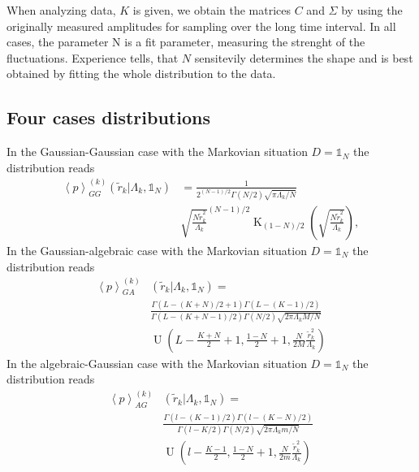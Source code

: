 When analyzing data, $K$ is given, we obtain the matrices $C$ and $\Sigma$ by
using the originally measured amplitudes for sampling over the long time interval.
In all cases, the parameter N is a fit parameter, measuring the strenght of the
fluctuations. Experience tells, that $N$ sensitevily determines the shape and is
best obtained by fitting the whole distribution to the data.

\subsection{Four cases distributions}\label{subsec:distributions}

In the Gaussian-Gaussian case with the Markovian situation $D = \mathbb{1}_{N}$
the distribution reads
\begin{equation}
    \begin{split}
    \left\langle p \right\rangle_{GG}^{\left(k\right)}
    \left(\tilde{r}_{k} \vert \Lambda_{k}, \mathbb{1}_{N}\right) &=
    \frac{1}{2^{\left(N - 1\right) / 2} \Gamma \left(N / 2\right)
    \sqrt{\pi \Lambda_{k} / N}} \\
    & \sqrt{\frac{N \tilde{r}_{k}^2}{\Lambda_{k}}}^{\left(N - 1\right) / 2}
    \operatorname{K}_{\left(1 - N\right)/2}
    \left( \sqrt{\frac{N \tilde{r}^2_{k}}{\Lambda_{k}}}\right),
    \end{split}
\end{equation}
In the Gaussian-algebraic case with the Markovian situation
$D = \mathbb{1}_{N}$ the distribution reads
\begin{equation}
    \begin{split}
    \left\langle p \right\rangle_{GA}^{\left(k\right)} &
    \left(\tilde{r}_{k} \vert \Lambda_{k}, \mathbb{1}_{N}\right) = \\
    &\frac{\Gamma\left(L - \left(K + N \right) / 2 + 1\right)
    \Gamma\left(L - \left(K - 1\right) / 2\right)}
    {\Gamma\left(L - \left(K + N - 1\right) / 2\right) \Gamma\left(N / 2\right)
    \sqrt{2\pi \Lambda_{k}M/N}} \\
    & \operatorname{U} \left(L - \frac{K + N}{2} + 1, \frac{1 - N}{2} + 1,
    \frac{N}{2M} \frac{\tilde{r}^{2}_{k}}{\Lambda_{k}}\right)
    \end{split}
\end{equation}
In the algebraic-Gaussian case with the Markovian situation
$D = \mathbb{1}_{N}$ the distribution reads
\begin{equation}
    \begin{split}
    \left\langle p \right\rangle_{AG}^{\left(k\right)} &
    \left(\tilde{r}_{k} \vert \Lambda_{k}, \mathbb{1}_{N}\right) = \\
    &\frac{\Gamma\left(l - \left(K - 1 \right) / 2\right)
    \Gamma\left(l - \left(K - N\right) / 2\right)}
    {\Gamma\left(l - K / 2\right) \Gamma\left(N / 2\right)
    \sqrt{2\pi \Lambda_{k}m/N}} \\
    & \operatorname{U} \left(l - \frac{K - 1}{2}, \frac{1 - N}{2} + 1,
    \frac{N}{2m} \frac{\tilde{r}^{2}_{k}}{\Lambda_{k}}\right)
    \end{split}
\end{equation}
